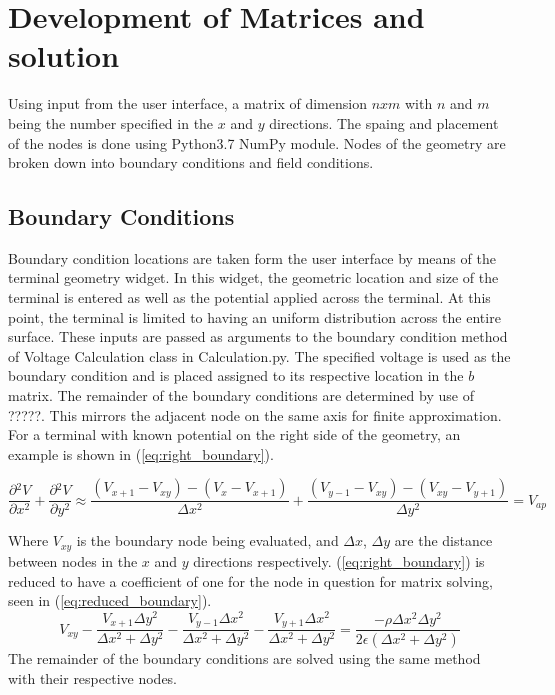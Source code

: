 \documentclass{article}[12pt]
\begin{document}
\section{Development of Matrices and solution}
	Using input from the user interface, a matrix of dimension $nxm$ with $n$ and $m$ being the number specified in the $x$ and $y$ directions. The spaing and placement of the nodes is done using Python3.7 NumPy module. Nodes of the geometry are broken down into boundary conditions and field conditions. 
\subsection{Boundary Conditions}
	Boundary condition locations are taken form the user interface by means of the terminal geometry widget. In this widget, the geometric location and size of the terminal is entered as well as the potential applied across the terminal. At this point, the terminal is limited to having an uniform distribution across the entire surface. These inputs are passed as arguments to the boundary condition method of Voltage Calculation class in Calculation.py. The specified voltage is used as the boundary condition and is placed assigned to its respective location in the $b$ matrix. The remainder of the boundary conditions are determined by use of ?????. This mirrors the adjacent node on the same axis for finite approximation. For a terminal with known potential on the right side of the geometry, an example is shown in (\ref{eq:right_boundary}).
	
	\begin{equation}
		\frac{\partial{^2V}}{\partial{x^2}}+\frac{\partial{^2V}}{\partial{y^2}} \approx \frac{\left(V_{x+1}-V_{xy}\right)-\left(V_x-V_{x+1}\right)}{\Delta x^2}+\frac{\left(V_{y-1}-V_{xy}\right)-\left(V_{xy}-V_{y+1}\right)}{\Delta y^2}=V_{ap}
		\label{eq:right_boundary}
	\end{equation}
	
Where $V_{xy}$ is the boundary node being evaluated, and $\Delta x$, $\Delta y$ are the distance between nodes in the $x$ and $y$ directions respectively. (\ref{eq:right_boundary}) is reduced to have a coefficient of one for the node in question for matrix solving, seen in (\ref{eq:reduced_boundary}).
	\begin{equation}
		V_{xy}-\frac{V_{x+1}\Delta y^2}{\Delta x^2+\Delta y^2}-\frac{V_{y-1}\Delta x^2}{\Delta  x^2+\Delta y^2}-\frac{V_{y+1}\Delta x^2}{\Delta  x^2+\Delta y^2}=\frac{-\rho \Delta  x^2 \Delta y^2}{2\epsilon\left(\Delta x^2+\Delta y^2\right)}
		\label{eq:reduced_boundary}
	\end{equation}
The remainder of the boundary conditions are solved using the same method with their respective nodes. 
\end{document}
